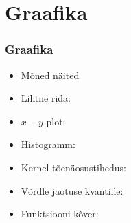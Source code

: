 \documentclass[pdftex]{beamer}
\begin{document}
\section{Graafika}

\begin{frame}
  \frametitle{Graafika}
  \begin{itemize}
  \item Mõned näited
  \item Lihtne rida: 
  \item $x-y$ plot: 
  \item Histogramm: 
  \item Kernel tõenäosustihedus: 
  \item Võrdle jaotuse kvantiile: 
  \item Funktsiooni kõver: 
  \end{itemize}
\end{frame}
\end{document}
